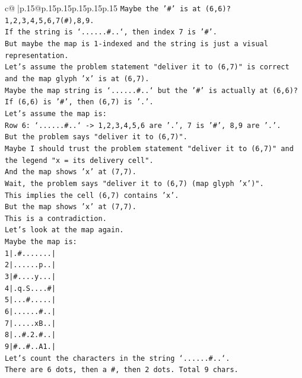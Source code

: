 \documentclass{article}
\begin{document}
{\begin{supertabular}{c@{$\;$}|p{.15\linewidth}@{}p{.15\linewidth}p{.15\linewidth}p{.15\linewidth}p{.15\linewidth}p{.15\linewidth}}
{{{\texttt{Maybe the '\#' is at (6,6)?} \\
\texttt{1,2,3,4,5,6,7(\#),8,9.} \\
\texttt{If the string is `......\#..`, then index 7 is '\#'.} \\
\texttt{But maybe the map is 1{-}indexed and the string is just a visual representation.} \\
\texttt{Let's assume the problem statement "deliver it to (6,7)" is correct and the map glyph 'x' is at (6,7).} \\
\texttt{Maybe the map string is `......\#..` but the '\#' is actually at (6,6)?} \\
\texttt{If (6,6) is '\#', then (6,7) is '.'.} \\
\texttt{Let's assume the map is:} \\
\texttt{Row 6: `......\#..` {-}> 1,2,3,4,5,6 are '.', 7 is '\#', 8,9 are '.'.} \\
\texttt{But the problem says "deliver it to (6,7)".} \\
\texttt{Maybe I should trust the problem statement "deliver it to (6,7)" and the legend "x = its delivery cell".} \\
\texttt{And the map shows 'x' at (7,7).} \\
\texttt{Wait, the problem says "deliver it to (6,7) (map glyph 'x')".} \\
\texttt{This implies the cell (6,7) contains 'x'.} \\
\texttt{But the map shows 'x' at (7,7).} \\
\texttt{This is a contradiction.} \\
\texttt{Let's look at the map again.} \\
\texttt{Maybe the map is:} \\
\texttt{1|.\#.......|} \\
\texttt{2|......p..|} \\
\texttt{3|\#....y...|} \\
\texttt{4|.q.S....\#|} \\
\texttt{5|...\#.....|} \\
\texttt{6|......\#..|} \\
\texttt{7|.....xB..|} \\
\texttt{8|..\#.2.\#..|} \\
\texttt{9|\#..\#..A1.|} \\
\texttt{Let's count the characters in the string `......\#..`.} \\
\texttt{There are 6 dots, then a \#, then 2 dots. Total 9 chars.} \\
}}}
\end{supertabular}}
\end{document}
